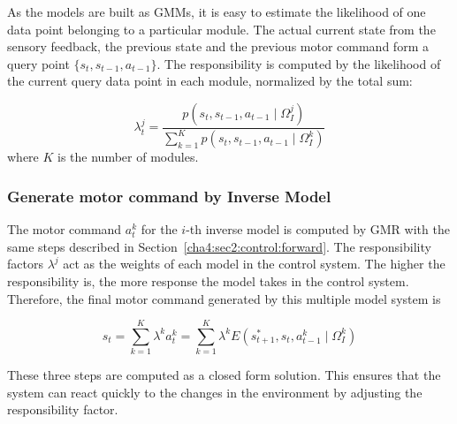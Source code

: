 As the models are built as GMMs, it is easy to estimate the likelihood of one data point belonging to a particular module. The actual current state from the sensory feedback, the previous state and the previous motor command form a query point $\{s_t,s_{t-1},a_{t-1}\}$. The responsibility is computed by the likelihood of the current query data point in each module, normalized by the total sum:

\begin{equation}
\lambda^j_t = \frac{p(s_t,s_{t-1},a_{t-1}\mid \Omega_I^j)}{\sum_{k=1}^{K}{p(s_t,s_{t-1},a_{t-1}\mid \Omega_I^k)}}
\end{equation}
where $K$ is the number of modules.


\subsubsection{Generate motor command by Inverse Model}
\label{cha4:sec2:control:inverse}

The motor command $a^k_t$ for the $i$-th inverse model is computed by GMR with the same steps  described in Section~\ref{cha4:sec2:control:forward}. The responsibility factors $\lambda^j$ act as the weights of each model in the control system. The higher the responsibility is, the more response the model takes in the control system. Therefore, the final motor command generated by this multiple model system is

\begin{equation}
\label{equ:e_mix}
s_t = \sum_{k=1}^K{\lambda^k a_t^k} = \sum_{k=1}^K{\lambda^k E\left({s^*_{t+1},s_t, a^k_{t-1} \mid \Omega^k_I}\right)}
\end{equation}

These three steps are computed as a closed form solution. This ensures that the system can react quickly to the changes in the environment by adjusting the responsibility factor.



